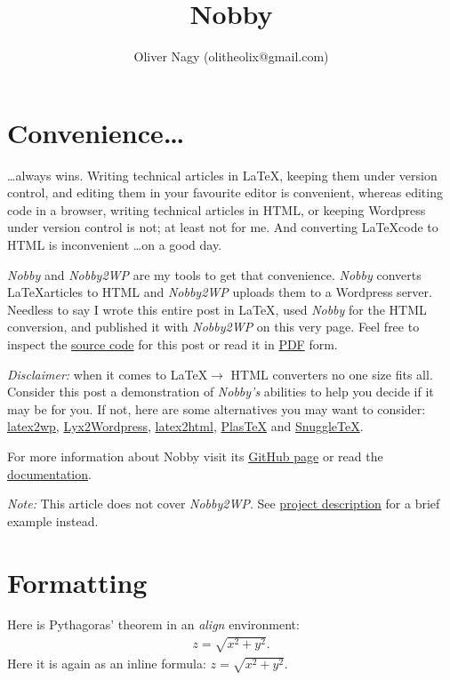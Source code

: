 \documentclass[10pt]{article}
\title{Nobby}
\author{Oliver Nagy (olitheolix@gmail.com)}
\begin{document}
\maketitle

\section*{Convenience\ldots}
\ldots always wins. Writing technical articles in \LaTeX, keeping them
under version control, and editing them in your favourite editor is
convenient, whereas editing code in a browser, writing technical
articles in HTML, or keeping Wordpress under version control is not;
at least not for me. And converting \LaTeX  code to HTML is
inconvenient \ldots on a good day.

\emph{Nobby} and \emph{Nobby2WP} are my tools to get that convenience.
\emph{Nobby} converts \LaTeX articles to HTML
and \emph{Nobby2WP} uploads them to a Wordpress server. Needless to
say I wrote this entire post in \LaTeX, used \emph{Nobby} for the
HTML conversion, and published it with \emph{Nobby2WP} on this very page. Feel
free to inspect the 
\href{https://github.com/olitheolix/nobby/blob/master/demo/demo.tex}{source
code} for this post or read it in \href{./demo.pdf}{PDF} form.

\emph{Disclaimer:} when it comes to \LaTeX $\to $ HTML converters no
one size fits all. Consider this post a demonstration of
\emph{Nobby's} abilities to help you decide if it may be for you. If not,
here are some alternatives you may want to consider:
\href{http://lucatrevisan.wordpress.com/latex-to-wordpress/}{latex2wp},
\href{http://physicspages.com/tag/latex2wp/}{Lyx2Wordpress},
\href{http://www.latex2html.org/}{latex2html},
\href{http://plastex.sourceforge.net/}{PlasTeX} and
\href{http://www2.ph.ed.ac.uk/snuggletex/documentation/overview-and-features.html}{SnuggleTeX}.

For more information about Nobby visit its
\href{https://github.com/olitheolix/nobby}{GitHub page} or read the
\href{https://olitheolix.com/doc/nobby}{documentation}.

\emph{Note:} This article does not cover \emph{Nobby2WP}. See 
\href{https://github.com/olitheolix/nobby}{project description}
for a brief example instead.

\section{Formatting}
\label{sec:one}
Here is Pythagoras' theorem in an \emph{align} environment:
\begin{align}
  \label{eq:pyth}
  z = \sqrt{x^2 + y^2}.
\end{align}
Here it is again as an inline formula: $z = \sqrt{x^2 + y^2}$.
\end{document}
